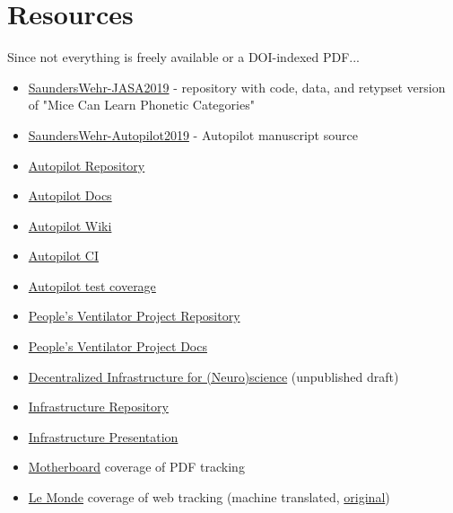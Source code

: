 





\clearpage

\section{Resources}

Since not everything is freely available or a DOI-indexed PDF...

\begin{itemize}
\item \href{https://github.com/wehr-lab/SaundersWehr-JASA2019}{SaundersWehr-JASA2019} - repository with code, data, and retypset version of "Mice Can Learn Phonetic Categories"
\item \href{https://github.com/wehr-lab/SaundersWehr-Autopilot2019}{SaundersWehr-Autopilot2019} - Autopilot manuscript source
\item \href{https://github.com/wehr-lab/autopilot}{Autopilot Repository}
\item \href{https://docs.auto-pi-lot.com}{Autopilot Docs}
\item \href{https://wiki.auto-pi-lot.com}{Autopilot Wiki}
\item \href{https://app.travis-ci.com/github/wehr-lab/autopilot/branches}{Autopilot CI}
\item \href{https://coveralls.io/github/wehr-lab/autopilot}{Autopilot test coverage}
\item \href{https://github.com/CohenLabPrinceton/pvp}{People's Ventilator Project Repository}
\item \href{https://www.peoplesvent.org/en/latest/index.html}{People's Ventilator Project Docs}
\item \href{https://jon-e.net/infrastructure}{Decentralized Infrastructure for (Neuro)science} (unpublished draft)
\item \href{https://github.com/sneakers-the-rat/infrastructure}{Infrastructure Repository}
\item \href{https://jon-e.net/infrastructure-presentation/}{Infrastructure Presentation}
\item \href{https://www.vice.com/en/article/4aw48g/academic-journal-claims-it-fingerprints-pdfs-for-ransomware-not-surveillance}{Motherboard} coverage of PDF tracking
\item \href{https://jon-e.net/img/2022-le-monde-tracking.pdf}{Le Monde} coverage of web tracking (machine translated, \href{https://www.lemonde.fr/sciences/article/2022/01/17/comment-les-editeurs-scientifiques-surveillent-les-chercheurs_6109840_1650684.html}{original})
\end{itemize}
